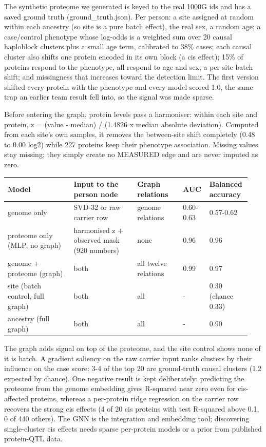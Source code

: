\documentclass[11pt,a4paper]{article}
\begin{document}
The synthetic proteome we generated is keyed to the real 1000G ids and has a saved ground truth (ground\_truth.json). Per person: a site assigned at random within each ancestry (so site is a pure batch effect), the real sex, a random age; a case/control phenotype whose log-odds is a weighted sum over 20 causal haploblock clusters plus a small age term, calibrated to 38\% cases; each causal cluster also shifts one protein encoded in its own block (a cis effect); 15\% of proteins respond to the phenotype, all respond to age and sex; a per-site batch shift; and missingness that increases toward the detection limit. The first version shifted every protein with the phenotype and every model scored 1.0, the same trap an earlier team result fell into, so the signal was made sparse.

Before entering the graph, protein levels pass a harmoniser: within each site and protein, z = (value - median) / (1.4826 x median absolute deviation). Computed from each site's own samples, it removes the between-site shift completely (0.48 to 0.00 log2) while 227 proteins keep their phenotype association. Missing values stay missing; they simply create no MEASURED edge and are never imputed as zero.

\begin{longtable}{p{0.263\linewidth}p{0.254\linewidth}p{0.188\linewidth}p{0.094\linewidth}p{0.141\linewidth}}
\toprule
\textbf{Model} & \textbf{Input to the person node} & \textbf{Graph relations} & \textbf{AUC} & \textbf{Balanced accuracy} \\
\midrule
\endhead
genome only & SVD-32 or raw carrier row & genome relations & 0.60-0.63 & 0.57-0.62 \\
proteome only (MLP, no graph) & harmonised z + observed mask (920 numbers) & none & 0.96 & 0.96 \\
genome + proteome (graph) & both & all twelve relations & 0.99 & 0.97 \\
site (batch control, full graph) & both & all & - & 0.30 (chance 0.33) \\
ancestry (full graph) & both & all & - & 0.90 \\
\bottomrule
\end{longtable}

The graph adds signal on top of the proteome, and the site control shows none of it is batch. A gradient saliency on the raw carrier input ranks clusters by their influence on the case score: 3-4 of the top 20 are ground-truth causal clusters (1.2 expected by chance). One negative result is kept deliberately: predicting the proteome from the genome embedding gives R-squared near zero even for cis-affected proteins, whereas a per-protein ridge regression on the carrier row recovers the strong cis effects (4 of 20 cis proteins with test R-squared above 0.1, 0 of 440 others). The GNN is the integration and embedding tool; discovering single-cluster cis effects needs sparse per-protein models or a prior from published protein-QTL data.
\end{document}
